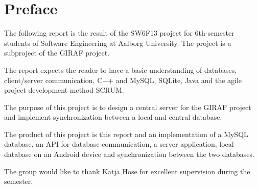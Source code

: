 \chapter*{Preface}
The following report is the result of the SW6F13 project for 6th-semester students of Software Engineering at
Aalborg University. The project is a subproject of the GIRAF project.

The report expects the reader to have a basic understanding of databases, client/server communication, C++ and
MySQL, SQLite, Java and the agile project development method SCRUM. 

The purpose of this project is to design a central server for the GIRAF project and implement synchronization between a local and central database.

The product of this project is this report and an implementation of a MySQL database, an API for database communication, a server application, local database on an Android device and synchronization between the two databases.

The group would like to thank Katja Hose for excellent supervision during the semester.



